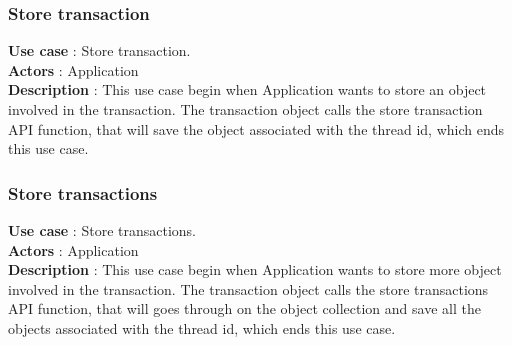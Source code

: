 \documentclass[12pt]{article}
\begin{document}
{\subsubsection{Store transaction}
\textbf{Use case} : Store transaction.\\
\textbf{Actors} : Application\\
\textbf{Description} : This use case begin when Application wants to store an object involved in the transaction. The transaction object calls the store transaction API function, that will save the object associated with the thread id, which ends this use case.\\
\subsubsection{Store transactions}
\textbf{Use case} : Store transactions.\\
\textbf{Actors} : Application\\
\textbf{Description} : This use case begin when Application wants to store more object involved in the transaction. The transaction object calls the store transactions API function, that will goes through on the object  collection and save all the objects associated with the thread id, which ends this use case.\\
}
\newpage
\end{document}
